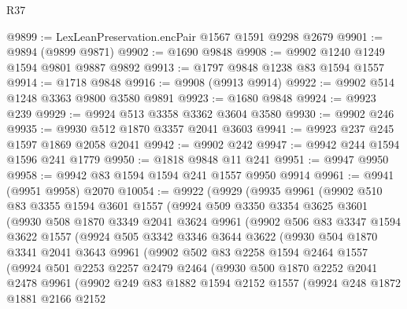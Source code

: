 \begin{lexlean}{R37}
\begin{coremodule}
@9899 := LexLeanPreservation.encPair @1567 @1591 @9298 @2679
@9901 := @9894 (@9899 @9871)
@9902 := @1690 @9848
@9908 := @9902 @1240 @1249 @1594 @9801 @9887 @9892
@9913 := @1797 @9848 @1238 @83 @1594 @1557
@9914 := @1718 @9848
@9916 := @9908 (@9913 @9914)
@9922 := @9902 @514 @1248 @3363 @9800 @3580 @9891
@9923 := @1680 @9848
@9924 := @9923 @239
@9929 := @9924 @513 @3358 @3362 @3604 @3580
@9930 := @9902 @246
@9935 := @9930 @512 @1870 @3357 @2041 @3603
@9941 := @9923 @237 @245 @1597 @1869 @2058 @2041
@9942 := @9902 @242
@9947 := @9942 @244 @1594 @1596 @241 @1779
@9950 := @1818 @9848 @11 @241
@9951 := @9947 @9950
@9958 := @9942 @83 @1594 @1594 @241 @1557 @9950 @9914
@9961 := @9941 (@9951 @9958) @2070
@10054 := @9922
    (@9929
      (@9935
        @9961
        (@9902
          @510
          @83
          @3355
          @1594
          @3601
          @1557
          (@9924
            @509
            @3350
            @3354
            @3625
            @3601
            (@9930
              @508
              @1870
              @3349
              @2041
              @3624
              @9961
              (@9902
                @506
                @83
                @3347
                @1594
                @3622
                @1557
                (@9924
                  @505
                  @3342
                  @3346
                  @3644
                  @3622
                  (@9930
                    @504
                    @1870
                    @3341
                    @2041
                    @3643
                    @9961
                    (@9902
                      @502
                      @83
                      @2258
                      @1594
                      @2464
                      @1557
                      (@9924
                        @501
                        @2253
                        @2257
                        @2479
                        @2464
                        (@9930
                          @500
                          @1870
                          @2252
                          @2041
                          @2478
                          @9961
                          (@9902
                            @249
                            @83
                            @1882
                            @1594
                            @2152
                            @1557
                            (@9924
                              @248
                              @1872
                              @1881
                              @2166
                              @2152

\end{coremodule}
\end{lexlean}
